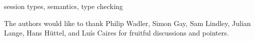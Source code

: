 \documentclass{sigplanconf}
\begin{document}


\keywords
session types, semantics, type checking

\pagestyle{plain}










\acks %

The authors would like to thank Philip Wadler, Simon Gay, Sam Lindley,
Julian Lange, Hans Hüttel, and Luís Caires for fruitful discussions
and pointers.










% 
\end{document}
